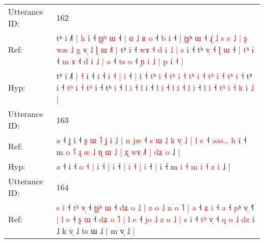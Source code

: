 \documentclass[10pt]{article}
\DeclareRobustCommand{\hl}[1]{{\textcolor{red}{#1}}}
\begin{document}
\begin{longtable}{ll}
 \\
\midrule
Utterance ID: & 162 \\
Ref: & tʰ i ˩˥ | \hl{h} i\hl{̃} ˧\hl{ }\hl{ʈ}\hl{ʂ}\hl{ʰ} \hl{ɯ} ˧\hl{ }\hl{|} \hl{ɑ} \hl{˩} \hl{ʁ} \hl{o} ˧ \hl{b} i ˧\hl{ }\hl{|} \hl{ʈ}\hl{ʂ}ʰ \hl{ɯ} ˧ \hl{ɻ}\hl{̍}\hl{ }\hl{˩} \hl{s} \hl{e} \hl{˩}\hl{ }\hl{|} \hl{ʂ} \hl{w}\hl{æ} \hl{˩}\hl{ }\hl{g} \hl{v}\hl{̩} \hl{˩} \hl{ɭ}\hl{ }\hl{ɯ} \hl{˩}\hl{˥} \hl{|} tʰ i ˧\hl{ }\hl{w}\hl{ɤ} \hl{˧}\hl{ }\hl{d} i \hl{˩} \hl{|}\hl{ }\hl{s} i ˧ tʰ \hl{v}\hl{̩} ˧ \hl{ɭ} \hl{ɯ} ˧\hl{ }\hl{|} \hl{t}\hl{ʰ} i ˧ \hl{m} \hl{ɤ} ˧ \hl{d} i \hl{˩} \hl{|} \hl{ə} ˧ \hl{t}\hl{s} \hl{o} ˧ \hl{ɲ}\hl{ }\hl{i} \hl{˩} \hl{|} \hl{p} i \hl{˧} |
 \\
Hyp: & tʰ i ˩˥ | \hl{˧} i\hl{} ˧\hl{}\hl{}\hl{}\hl{} \hl{i} ˧\hl{}\hl{} \hl{i} \hl{˧} \hl{|} \hl{i} ˧ \hl{|} i ˧\hl{}\hl{} \hl{}\hl{t}ʰ \hl{i} ˧ \hl{}\hl{}\hl{t}\hl{ʰ} \hl{i} \hl{˧} \hl{}\hl{t}\hl{ʰ} \hl{i} \hl{}\hl{˧} \hl{}\hl{t}\hl{ʰ} \hl{}\hl{i} \hl{˧} \hl{}\hl{t}\hl{ʰ} \hl{}\hl{i} \hl{˧} tʰ i ˧\hl{}\hl{}\hl{} \hl{}\hl{t}\hl{ʰ} i \hl{˧} \hl{}\hl{t}\hl{ʰ} i ˧ tʰ \hl{}\hl{i} ˧ \hl{l} \hl{i} ˧\hl{}\hl{} \hl{}\hl{l} i ˧ \hl{l} \hl{i} ˧ \hl{l} i \hl{˧} \hl{l} \hl{i} ˧ \hl{}\hl{l} \hl{i} ˧ \hl{}\hl{t}\hl{ʰ} \hl{i} \hl{˧} \hl{k} i \hl{˩} |
 \\
\midrule
Utterance ID: & 163 \\
Ref: & ə ˧\hl{ }\hl{ʝ} i ˧\hl{ }\hl{ʂ} \hl{ɯ} \hl{˥} \hl{ʝ} i \hl{˩} |\hl{ }\hl{n} \hl{j}\hl{æ} ˧\hl{ }\hl{s}\hl{ }\hl{ɯ}\hl{ }\hl{˩} \hl{k} \hl{v}\hl{̩} \hl{˩} |\hl{ }\hl{l} \hl{e} ˧\hl{ }\hl{ə}\hl{ə}\hl{ə}\hl{…} \hl{h} i\hl{̃} ˧ m\hl{ }\hl{o}\hl{ }\hl{˥}\hl{ }\hl{ɻ}\hl{ }\hl{æ}\hl{ }\hl{˩}\hl{ }\hl{ɳ}\hl{ }\hl{ɯ}\hl{ }\hl{˩} \hl{|} \hl{ʐ} \hl{w}\hl{ɤ} \hl{˩}\hl{˥} \hl{|} \hl{d}\hl{ʑ} \hl{o} ˩ |
 \\
Hyp: & ə ˧\hl{}\hl{} i ˧\hl{}\hl{} \hl{o} \hl{˧} \hl{|} i \hl{˧} |\hl{}\hl{} \hl{}\hl{i} ˧\hl{}\hl{}\hl{}\hl{}\hl{}\hl{} \hl{|} \hl{}\hl{i} \hl{˧} |\hl{}\hl{} \hl{i} ˧\hl{}\hl{}\hl{}\hl{}\hl{} \hl{|} i\hl{} ˧ m\hl{}\hl{}\hl{}\hl{}\hl{}\hl{}\hl{}\hl{}\hl{}\hl{}\hl{}\hl{}\hl{}\hl{}\hl{}\hl{} \hl{i} \hl{˧} \hl{}\hl{m} \hl{}\hl{i} \hl{˧} \hl{}\hl{z} \hl{i} ˩ |
 \\
\midrule
Utterance ID: & 164 \\
Ref: & \hl{s}\hl{ }\hl{i} ˧\hl{ }\hl{t}\hl{ʰ} \hl{v}\hl{̩} ˧\hl{ }\hl{ʈ}\hl{ʂ}\hl{ʰ} \hl{ɯ} ˧\hl{ }\hl{d}\hl{ʑ}\hl{ }\hl{o}\hl{ }\hl{˩} |\hl{ }\hl{z}\hl{ }\hl{o}\hl{ }\hl{˩}\hl{ }\hl{n} \hl{o} \hl{˥} | \hl{ə} ˧\hl{ }\hl{ʑ} \hl{i}\hl{ }\hl{˧} \hl{ə} ˧ \hl{p}ʰ \hl{v}\hl{̩} ˧\hl{˥} \hl{|}\hl{ }\hl{l} \hl{e} ˧ \hl{}\hl{ʂ} \hl{ɯ} ˧ \hl{d}\hl{ʑ}\hl{ }\hl{o} \hl{˥} \hl{|} l \hl{e} ˧ \hl{j}\hl{o} \hl{˩} \hl{z} \hl{o} \hl{˩} \hl{|} \hl{s} i ˧ \hl{t}\hl{ʰ} \hl{v}\hl{̩} ˧ \hl{q} \hl{o} \hl{˩} \hl{d}\hl{z} i ˩ k \hl{v}\hl{̩} ˩ ts ɯ ˩ | m v̩ ˩\hl{ }\hl{|}

\end{longtable}
\end{document}
